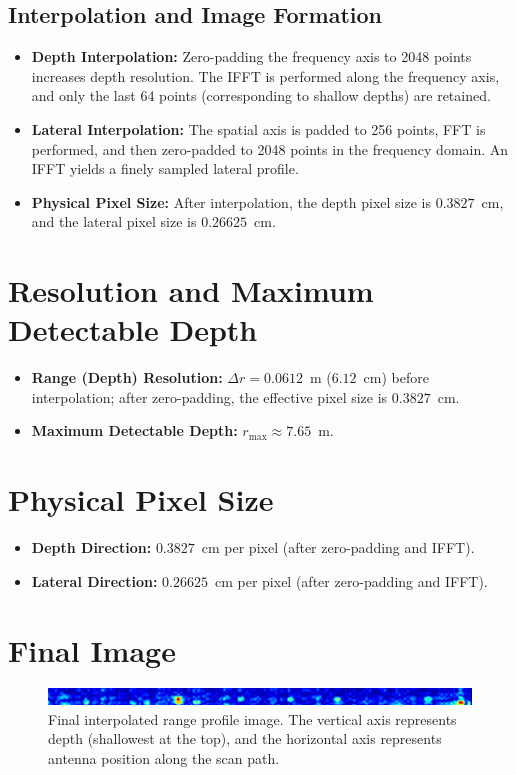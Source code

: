 \documentclass[12pt]{article}
\begin{document}
\subsection{Interpolation and Image Formation}
\begin{itemize}
    \item \textbf{Depth Interpolation:} Zero-padding the frequency axis to 2048 points increases depth resolution. The IFFT is performed along the frequency axis, and only the last 64 points (corresponding to shallow depths) are retained.
    \item \textbf{Lateral Interpolation:} The spatial axis is padded to 256 points, FFT is performed, and then zero-padded to 2048 points in the frequency domain. An IFFT yields a finely sampled lateral profile.
    \item \textbf{Physical Pixel Size:} After interpolation, the depth pixel size is $0.3827$~cm, and the lateral pixel size is $0.26625$~cm.
\end{itemize}

\section{Resolution and Maximum Detectable Depth}
\begin{itemize}
    \item \textbf{Range (Depth) Resolution:} $\Delta r = 0.0612$~m ($6.12$~cm) before interpolation; after zero-padding, the effective pixel size is $0.3827$~cm.
    \item \textbf{Maximum Detectable Depth:} $r_{\text{max}} \approx 7.65$~m.
\end{itemize}

\section{Physical Pixel Size}
\begin{itemize}
    \item \textbf{Depth Direction:} $0.3827$~cm per pixel (after zero-padding and IFFT).
    \item \textbf{Lateral Direction:} $0.26625$~cm per pixel (after zero-padding and IFFT).
\end{itemize}

\section{Final Image}
\begin{figure}[H]
    \centering
    \includegraphics[width=1.0\textwidth]{depth_map.png}
    \caption{Final interpolated range profile image. The vertical axis represents depth (shallowest at the top), and the horizontal axis represents antenna position along the scan path.}
\end{figure}
\end{document}
